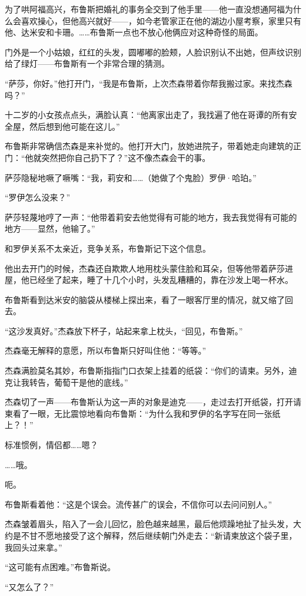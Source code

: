 \documentclass[../main]{subfiles}
\begin{document}
为了哄阿福高兴，布鲁斯把婚礼的事务全交到了他手里——他一直没想通阿福为什么会喜欢操心，但他高兴就好——，如今老管家正在他的湖边小屋考察，家里只有他、达米安和卡珊。……布鲁斯一点也不放心他俩应对这种奇怪的局面。

门外是一个小姑娘，红红的头发，圆嘟嘟的脸颊，人脸识别认不出她，但声纹识别给了绿灯——布鲁斯有一个非常合理的猜测。

“萨莎，你好。”他打开门，“我是布鲁斯，上次杰森带着你帮我搬过家。来找杰森吗？”

十二岁的小女孩点点头，满脸认真：“他离家出走了，我找遍了他在哥谭的所有安全屋，然后想到他可能在这儿。”

布鲁斯非常确信杰森是来补觉的。他打开大门，放她进院子，带着她走向建筑的正门：“他就突然把你自己扔下了？”这不像杰森会干的事。

萨莎隐秘地噘了噘嘴：“我，莉安和……（她做了个鬼脸）罗伊·哈珀。”

“罗伊怎么没来？”

萨莎轻蔑地哼了一声：“他带着莉安去他觉得有可能的地方，我去我觉得有可能的地方——显然，他输了。”

和罗伊关系不太亲近，竞争关系，布鲁斯记下这个信息。

他出去开门的时候，杰森还自欺欺人地用枕头蒙住脸和耳朵，但等他带着萨莎进屋，他已经坐了起来，睡了十几个小时，头发乱糟糟的，靠在沙发上喝一杯水。

布鲁斯看到达米安的脑袋从楼梯上探出来，看了一眼客厅里的情况，就又缩了回去。

“这沙发真好。”杰森放下杯子，站起来拿上枕头，“回见，布鲁斯。”

杰森毫无解释的意愿，所以布鲁斯只好叫住他：“等等。”

杰森满脸莫名其妙，布鲁斯指指门口衣架上挂着的纸袋：“你们的请柬。另外，迪克让我转告，葡萄干是他的底线。”

杰森切了一声——布鲁斯认为这一声的对象是迪克——，走过去打开纸袋，打开请柬看了一眼，无比震惊地看向布鲁斯：“为什么我和罗伊的名字写在同一张纸上？！”

标准惯例，情侣都……嗯？

……哦。

呃。

布鲁斯看着他：“这是个误会。流传甚广的误会，不信你可以去问问别人。”

杰森皱着眉头，陷入了一会儿回忆，脸色越来越黑，最后他烦躁地扯了扯头发，大约是不甘不愿地接受了这个解释，然后继续朝门外走去：“新请柬放这个袋子里，我回头过来拿。”

“这可能有点困难。”布鲁斯说。

“又怎么了？”
\end{document}
